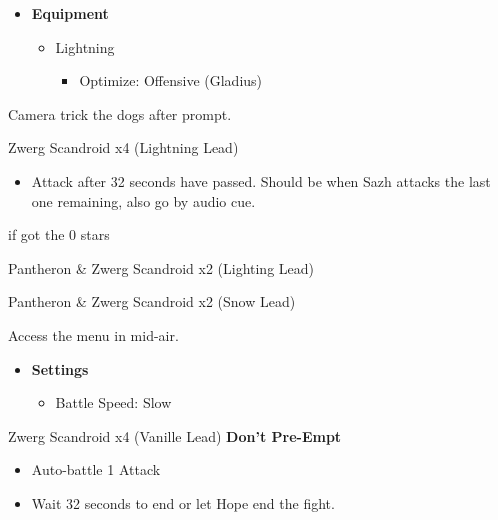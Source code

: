 \begin{paracol}{2}
	\begin{menu}
		\begin{itemize}
			\item \textbf{Equipment}
			      \begin{itemize}
				      \item Lightning
				            \begin{itemize}
					            \item Optimize: Offensive (Gladius)
				            \end{itemize}
			      \end{itemize}
		\end{itemize}
	\end{menu}
	\switchcolumn
	Camera trick the dogs after prompt.

	\begin{battle}{Zwerg Scandroid x4 (Lightning Lead)}
		\begin{itemize}
			\item Attack after 32 seconds have passed. Should be when Sazh attacks the last one remaining, also go by audio cue.
		\end{itemize}
		 if got the 0 stars
	\end{battle}


	\begin{battle}{Pantheron \& Zwerg Scandroid x2 (Lighting Lead)}
	\end{battle}

	\switchcolumn*
	\begin{battle}{Pantheron \& Zwerg Scandroid x2 (Snow Lead)}
	\end{battle}
	Access the menu in mid-air.

	\begin{menu}
		\begin{itemize}
			\item \textbf{Settings}
			      \begin{itemize}
				      \item Battle Speed: Slow
			      \end{itemize}
		\end{itemize}
	\end{menu}

	\begin{battle}{Zwerg Scandroid x4 (Vanille Lead) \textbf{Don't Pre-Empt}}
		\begin{itemize}
			\item Auto-battle 1 Attack
			\item Wait 32 seconds to end or let Hope end the fight.
		\end{itemize}
	\end{battle}


\end{paracol}
